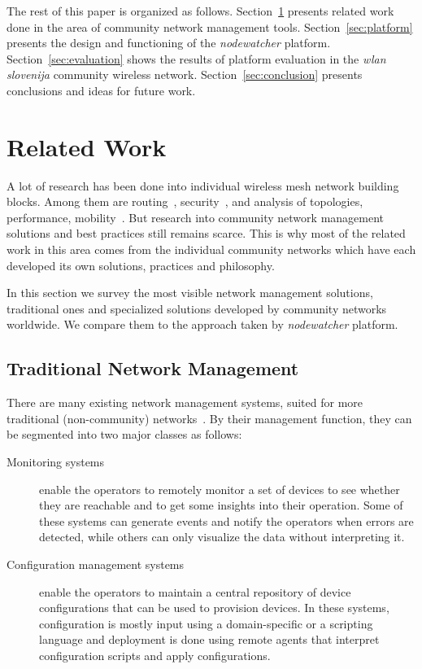 \documentclass[5p,sort&compress]{elsarticle}
\newcommand{\nodewatcher}{\textit{nodewatcher}}
\newcommand{\wlanslovenija}{\textit{wlan slovenija}}
\begin{document}
The rest of this paper is organized as follows.
Section~\ref{sec:related-work} presents related work done in the area of community network management tools.
Section~\ref{sec:platform} presents the design and functioning of the \nodewatcher{} platform.
Section~\ref{sec:evaluation} shows the results of platform evaluation in the \wlanslovenija{} community wireless network.
Section~\ref{sec:conclusion} presents conclusions and ideas for future work.

\section{Related Work}
\label{sec:related-work}

A lot of research has been done into individual wireless mesh network building blocks. Among them are routing~\cite{Murray_2010,Neumann_2012}, security~\cite{Siddiqui_2007}, and analysis of topologies, performance, mobility~\cite{Vega_2012,Zakrzewska_2008}.
But research into community network management solutions and best practices still remains scarce.
This is why most of the related work in this area comes from the individual community networks which have each developed its own solutions, practices and philosophy.

In this section we survey the most visible network management solutions, traditional ones and specialized solutions developed by community networks worldwide.
We compare them to the approach taken by \nodewatcher{} platform.

\subsection{Traditional Network Management}

There are many existing network management systems, suited for more traditional (non-community) networks~\cite{Cacti_2004,Nagios_1999,Zabbix_2004,Puppet_2005,Salt_2011}.
By their management function, they can be segmented into two major classes as follows:
\begin{description}
\item[Monitoring systems] enable the operators to remotely monitor a set of devices to see whether they are reachable and to get some insights into their operation.
Some of these systems can generate events and notify the operators when errors are detected, while others can only visualize the data without interpreting it.

\item[Configuration management systems] enable the operators to maintain a central repository of device configurations that can be used to provision devices.
In these systems, configuration is mostly input using a domain-specific or a scripting language and deployment is done using remote agents that interpret configuration scripts and apply configurations.
\end{description}
\end{document}
